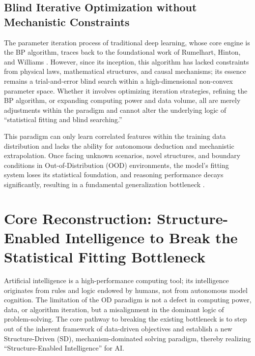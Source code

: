 \documentclass[11pt,a4paper]{article}
\begin{document}
\subsection{Blind Iterative Optimization without Mechanistic Constraints}
The parameter iteration process of traditional deep learning, whose core engine is the BP algorithm, traces back to the foundational work of Rumelhart, Hinton, and Williams \cite{rumelhart1986}. However, since its inception, this algorithm has lacked constraints from physical laws, mathematical structures, and causal mechanisms; its essence remains a trial-and-error blind search within a high-dimensional non-convex parameter space. Whether it involves optimizing iteration strategies, refining the BP algorithm, or expanding computing power and data volume, all are merely adjustments within the paradigm and cannot alter the underlying logic of ``statistical fitting and blind searching.''

This paradigm can only learn correlated features within the training data distribution and lacks the ability for autonomous deduction and mechanistic extrapolation. Once facing unknown scenarios, novel structures, and boundary conditions in Out-of-Distribution (OOD) environments, the model's fitting system loses its statistical foundation, and reasoning performance decays significantly, resulting in a fundamental generalization bottleneck \cite{tikhonov1977,engl1996}.

\section{Core Reconstruction: Structure-Enabled Intelligence to Break the Statistical Fitting Bottleneck}
Artificial intelligence is a high-performance computing tool; its intelligence originates from rules and logic endowed by humans, not from autonomous model cognition. The limitation of the OD paradigm is not a defect in computing power, data, or algorithm iteration, but a misalignment in the dominant logic of problem-solving. The core pathway to breaking the existing bottleneck is to step out of the inherent framework of data-driven objectives and establish a new Structure-Driven (SD), mechanism-dominated solving paradigm, thereby realizing ``Structure-Enabled Intelligence'' for AI.
\end{document}
